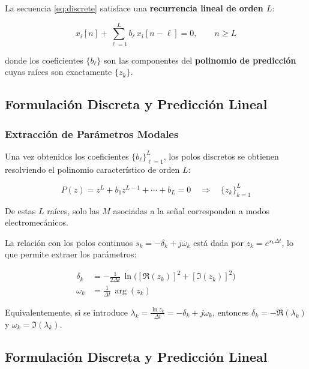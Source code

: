 La secuencia \eqref{eq:discrete} satisface una \textbf{recurrencia lineal de orden $L$}:

\begin{equation}
    x_i[n] + \sum_{\ell=1}^{L} b_\ell\, x_i[n-\ell] = 0, \qquad n \geq L
    \label{eq:ar}
\end{equation}

donde los coeficientes $\{b_\ell\}$ son las componentes del \textbf{polinomio de predicción} cuyas raíces son exactamente $\{z_k\}$.


\subsection{Formulación Discreta y Predicción Lineal}
\subsubsection{Extracción de Parámetros Modales}

Una vez obtenidos los coeficientes $\{b_\ell\}_{\ell=1}^{L}$, los polos discretos se obtienen resolviendo el polinomio característico de orden $L$:

\begin{equation}
    P(z) = z^{L} + b_1 z^{L-1} + \cdots + b_L = 0
    \quad \Rightarrow \quad \{z_k\}_{k=1}^{L}
    \label{eq:poly}
\end{equation}

De estas $L$ raíces, solo las $M$ asociadas a la señal corresponden a modos electromecánicos.

La relación con los polos continuos $s_k = -\delta_k + j\omega_k$ está dada por $z_k = e^{s_k \Delta t}$, lo que permite extraer los parámetros:

\begin{align}
    \delta_k &= -\frac{1}{2\Delta t}\,\ln\!\bigl([\Re(z_k)]^2 + [\Im(z_k)]^2\bigr) \label{eq:delta} \\
    \omega_k &= \frac{1}{\Delta t}\,\arg(z_k) \label{eq:omega}
\end{align}

 Equivalentemente, si se introduce $\lambda_k = \frac{\ln z_k}{\Delta t} = -\delta_k + j\omega_k$, entonces
 $\delta_k = -\Re(\lambda_k)$ y $\omega_k = \Im(\lambda_k)$.

    \subsection{Formulación Discreta y Predicción Lineal}
